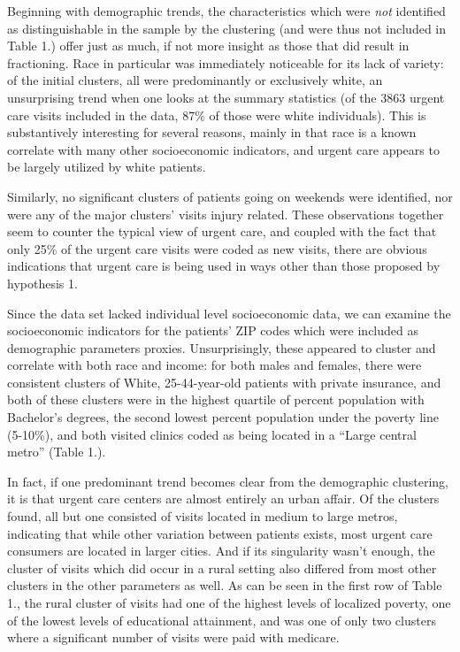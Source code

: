 \documentclass[12pt,twoside]{reedthesis}
\begin{document}
  Beginning with demographic trends, the characteristics which were
  \emph{not} identified as distinguishable in the sample by the clustering
  (and were thus not included in Table 1.) offer just as much, if not more
  insight as those that did result in fractioning. Race in particular was
  immediately noticeable for its lack of variety: of the initial clusters,
  all were predominantly or exclusively white, an unsurprising trend when
  one looks at the summary statistics (of the 3863 urgent care visits
  included in the data, 87\% of those were white individuals). This is
  substantively interesting for several reasons, mainly in that race is a
  known correlate with many other socioeconomic indicators, and urgent
  care appears to be largely utilized by white patients.
  
  Similarly, no significant clusters of patients going on weekends were
  identified, nor were any of the major clusters' visits injury related.
  These observations together seem to counter the typical view of urgent
  care, and coupled with the fact that only 25\% of the urgent care visits
  were coded as new visits, there are obvious indications that urgent care
  is being used in ways other than those proposed by hypothesis 1.
  
  Since the data set lacked individual level socioeconomic data, we can
  examine the socioeconomic indicators for the patients' ZIP codes which
  were included as demographic parameters proxies. Unsurprisingly, these
  appeared to cluster and correlate with both race and income: for both
  males and females, there were consistent clusters of White,
  25-44-year-old patients with private insurance, and both of these
  clusters were in the highest quartile of percent population with
  Bachelor's degrees, the second lowest percent population under the
  poverty line (5-10\%), and both visited clinics coded as being located
  in a ``Large central metro'' (Table 1.).
  
  In fact, if one predominant trend becomes clear from the demographic
  clustering, it is that urgent care centers are almost entirely an urban
  affair. Of the clusters found, all but one consisted of visits located
  in medium to large metros, indicating that while other variation between
  patients exists, most urgent care consumers are located in larger
  cities. And if its singularity wasn't enough, the cluster of visits
  which did occur in a rural setting also differed from most other
  clusters in the other parameters as well. As can be seen in the first
  row of Table 1., the rural cluster of visits had one of the highest
  levels of localized poverty, one of the lowest levels of educational
  attainment, and was one of only two clusters where a significant number
  of visits were paid with medicare.
  
\end{document}
